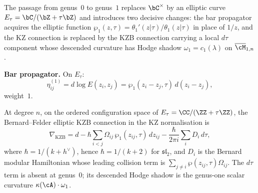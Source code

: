 \begin{example}
\label{ex:ord-ch-ell-yangian}
The passage from genus~$0$ to genus~$1$ replaces $\bC^\times$
by an elliptic curve $E_\tau = \bC/(\bZ + \tau\bZ)$ and
introduces two decisive changes: the bar propagator
acquires the elliptic function
$\wp_1(z,\tau) = \theta_1'(z|\tau)/\theta_1(z|\tau)$ in
place of $1/z$, and the KZ connection is replaced by the
KZB connection carrying a local $d\tau$ component whose descended
curvature has Hodge shadow $\omega_1 = c_1(\lambda)$ on
$\overline{\cM}_{1,n}$.

\smallskip
\noindent
\textbf{Bar propagator.} On $E_\tau$:
\begin{equation}\label{eq:v1-bar-prop-ell}
 \eta^{(1)}_{ij}
 = d\log E(z_i, z_j)
 = \wp_1(z_i - z_j, \tau)\,d(z_i - z_j),
\end{equation}
weight~$1$.

\begin{definition}
\label{def:elliptic-kzb-connection}
At degree $n$, on the ordered configuration space of
$E_\tau=\CC/(\ZZ+\tau\ZZ)$, the Bernard--Felder elliptic KZB
connection in the KZ normalisation is
\begin{equation}\label{eq:v1-kzb-conn}
 \nabla_{\mathrm{KZB}}
 = d
 - \hbar \sum_{i < j}
 \Omega_{ij}\,\wp_1(z_{ij}, \tau)\,dz_{ij}
 - \frac{\hbar}{2\pi i}
 \sum_i D_i\,d\tau,
\end{equation}
where $\hbar = 1/(k + h^\vee)$, hence
$\hbar=1/(k+2)$ for $\mathfrak{sl}_2$, and
$D_i$ is the Bernard modular Hamiltonian whose leading
collision term is
$\sum_{j\neq i}\wp(z_{ij},\tau)\Omega_{ij}$.
The $d\tau$ term is absent at genus~$0$; its descended
Hodge shadow is the genus-one scalar curvature
$\kappa(\cA)\cdot\omega_1$.
\end{definition}


\end{example}
